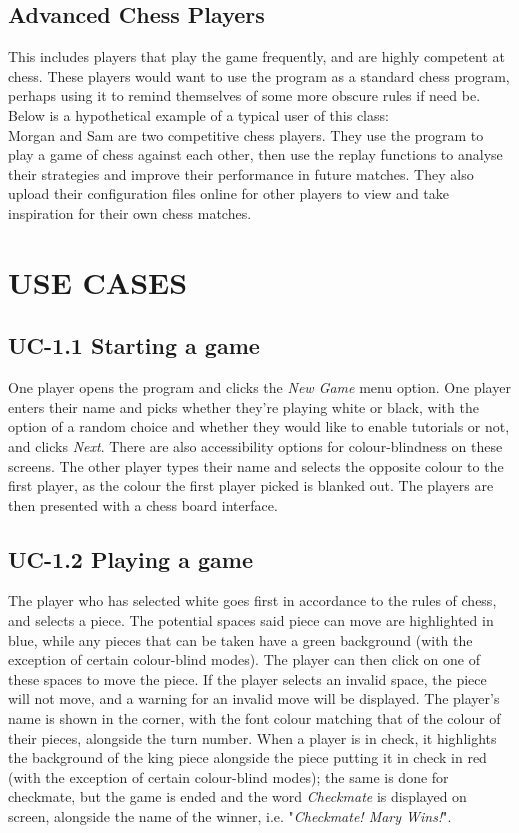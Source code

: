 \documentclass{project}
\begin{document}
\subsection{Advanced Chess Players}
This includes players that play the game frequently, and are highly competent at chess. These players would want to use the program as a standard chess program, perhaps using it to remind themselves of some more obscure rules if need be. Below is a hypothetical example of a typical user of this class:\\
Morgan and Sam are two competitive chess players. They use the program to play a game of chess against each other, then use the replay functions to analyse their strategies and improve their performance in future matches. They also upload their configuration files online for other players to view and take inspiration for their own chess matches.
\section{USE CASES}
\subsection{UC-1.1 Starting a game}
One player opens the program and clicks the \emph{New Game} menu option. One player enters their name and picks whether they're playing white or black, with the option of a random choice and whether they would like to enable tutorials or not, and clicks \emph{Next}. There are also accessibility options for colour-blindness on these screens. The other player types their name and selects the opposite colour to the first player, as the colour the first player picked is blanked out. The players are then presented with a chess board interface.
\subsection{UC-1.2 Playing a game}
The player who has selected white goes first in accordance to the rules of chess, and selects a piece. The potential spaces said piece can move are highlighted in blue, while any pieces that can be taken have a green background (with the exception of certain colour-blind modes). The player can then click on one of these spaces to move the piece. If the player selects an invalid space, the piece will not move, and a warning for an invalid move will be displayed. The player's name is shown in the corner, with the font colour matching that of the colour of their pieces, alongside the turn number. When a player is in check, it highlights the background of the king piece alongside the piece putting it in check in red (with the exception of certain colour-blind modes); the same is done for checkmate, but the game is ended and the word \emph{Checkmate} is displayed on screen, alongside the name of the winner, i.e. "\emph{Checkmate! Mary Wins!}".
\end{document}
